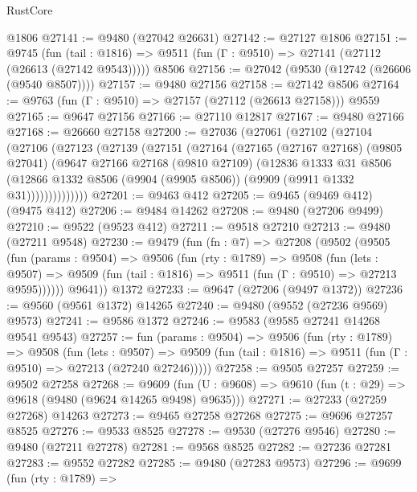 \begin{lexlean}{RustCore}
\begin{coremodule}
    @1806
@27141 := @9480 (@27042 @26631)
@27142 := @27127 @1806
@27151 := @9745
    (fun (tail : @1816) => @9511 (fun (Γ : @9510) => @27141 (@27112 (@26613 (@27142 @9543)))))
    @8506
@27156 := @27042 (@9530 (@12742 (@26606 (@9540 @8507))))
@27157 := @9480 @27156
@27158 := @27142 @8506
@27164 := @9763 (fun (Γ : @9510) => @27157 (@27112 (@26613 @27158))) @9559
@27165 := @9647 @27156
@27166 := @27110 @12817
@27167 := @9480 @27166
@27168 := @26660 @27158
@27200 := @27036
    (@27061
      (@27102
        (@27104
          (@27106
            (@27123
              (@27139
                (@27151
                  (@27164
                    (@27165
                      (@27167 @27168)
                      (@9805 @27041)
                      (@9647
                        @27166
                        @27168
                        (@9810 @27109)
                        (@12836
                          @1333
                          @31
                          @8506
                          (@12866
                            @1332
                            @8506
                            (@9904 (@9905 @8506))
                            (@9909 (@9911 @1332 @31))))))))))))))
@27201 := @9463 @412
@27205 := @9465 (@9469 @412) (@9475 @412)
@27206 := @9484 @14262
@27208 := @9480 (@27206 @9499)
@27210 := @9522 (@9523 @412)
@27211 := @9518 @27210
@27213 := @9480 (@27211 @9548)
@27230 := @9479
    (fun (fn : @7) =>
    @27208
      (@9502
        (@9505
          (fun (params : @9504) =>
          @9506
            (fun (rty : @1789) =>
            @9508
              (fun (lets : @9507) =>
              @9509 (fun (tail : @1816) => @9511 (fun (Γ : @9510) => @27213 @9595))))))
        @9641))
    @1372
@27233 := @9647 (@27206 (@9497 @1372))
@27236 := @9560 (@9561 @1372) @14265
@27240 := @9480 (@9552 (@27236 @9569) @9573)
@27241 := @9586 @1372
@27246 := @9583 (@9585 @27241 @14268 @9541 @9543)
@27257 := fun (params : @9504) =>
  @9506
    (fun (rty : @1789) =>
    @9508
      (fun (lets : @9507) =>
      @9509 (fun (tail : @1816) => @9511 (fun (Γ : @9510) => @27213 (@27240 @27246)))))
@27258 := @9505 @27257
@27259 := @9502 @27258
@27268 := @9609
    (fun (U : @9608) => @9610 (fun (t : @29) => @9618 (@9480 (@9624 @14265 @9498) @9635)))
@27271 := @27233 (@27259 @27268) @14263
@27273 := @9465 @27258 @27268
@27275 := @9696 @27257 @8525
@27276 := @9533 @8525
@27278 := @9530 (@27276 @9546)
@27280 := @9480 (@27211 @27278)
@27281 := @9568 @8525
@27282 := @27236 @27281
@27283 := @9552 @27282
@27285 := @9480 (@27283 @9573)
@27296 := @9699
    (fun (rty : @1789) =>

\end{coremodule}
\end{lexlean}

